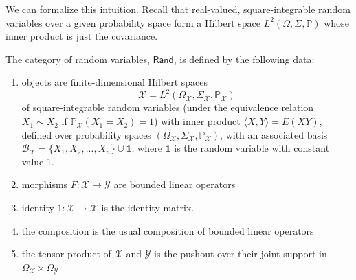 \documentclass[sigconf]{acmart}
\newcommand{\grayout}[1]{{\color{gray}#1}}
\newcommand{\Cat}[1]{\mathsf{#1}}
\def\Rand{\Cat{Rand}}
\def\Cor{\textnormal{Cor}}
\def\One{\textbf{1}}
\begin{document}
\grayout{
We can formalize this intuition. Recall that real-valued, square-integrable random variables over a given probability space form a Hilbert space $L^2(\Omega, \Sigma, \mathbb{P})$ whose inner product is just the covariance. %

\begin{definition}
The category of random variables, $\Rand$, is defined by the following data:
\begin{enumerate}
\item objects are finite-dimensional Hilbert spaces \[ \mathcal{X} = L^2(\Omega_\mathcal{X}, \Sigma_\mathcal{X}, \mathbb{P}_\mathcal{X})\] of square-integrable random variables (under the equivalence relation $X_1 \sim X_2$ if $\mathbb{P}_\mathcal{X}(X_1 = X_2) = 1$) with inner product $\langle X,Y\rangle = E(XY)$, defined over probability spaces $(\Omega_\mathcal{X}, \Sigma_\mathcal{X}, \mathbb{P}_\mathcal{X})$, with an associated basis $\mathcal{B}_\mathcal{X} = \{ X_1, X_2, ..., X_n \} \cup \One$, where $\One$ is the random variable with constant value 1. %
\item morphisms $F: \mathcal{X} \to \mathcal{Y}$ are bounded linear operators
\item identity $1 : \mathcal{X} \to \mathcal{X}$ is the identity matrix.
\item the composition is the usual composition of bounded linear operators
\item the tensor product of $\mathcal{X}$ and $\mathcal{Y}$ is the pushout over their joint support in $\Omega_\mathcal{X} \times \Omega_\mathcal{Y}$



\end{enumerate}
\end{definition}}
\end{document}
